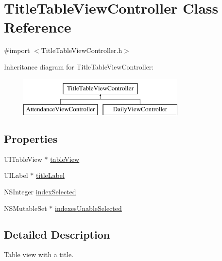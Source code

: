 \hypertarget{interface_title_table_view_controller}{\section{\-Title\-Table\-View\-Controller \-Class \-Reference}
\label{interface_title_table_view_controller}
}


{\ttfamily \#import $<$\-Title\-Table\-View\-Controller.\-h$>$}

\-Inheritance diagram for \-Title\-Table\-View\-Controller\-:\begin{figure}[H]
\begin{center}
\leavevmode
\includegraphics[height=2.000000cm]{interface_title_table_view_controller}
\end{center}
\end{figure}
\subsection*{\-Properties}
\begin{DoxyCompactItemize}
\item 
\-U\-I\-Table\-View $\ast$ \hyperlink{interface_title_table_view_controller_a28fd55d5b91428c42c821986765afc79}{table\-View}
\item 
\-U\-I\-Label $\ast$ \hyperlink{interface_title_table_view_controller_ac0cf26350746393ad93fae7c1dc0f071}{title\-Label}
\item 
\-N\-S\-Integer \hyperlink{interface_title_table_view_controller_a836ce3317d51d9812f9407611df8327e}{index\-Selected}
\item 
\-N\-S\-Mutable\-Set $\ast$ \hyperlink{interface_title_table_view_controller_a97663dd3b86d043d6371a80216ecaf1d}{indexes\-Unable\-Selected}
\end{DoxyCompactItemize}


\subsection{\-Detailed \-Description}
\-Table view with a title. 

